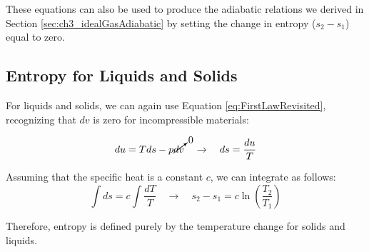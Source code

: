 These equations can also be used to produce the adiabatic relations we derived in Section \ref{sec:ch3_idealGasAdiabatic} by setting the change in entropy ($s_2 -s_1$) equal to zero.

\subsection{Entropy for Liquids and Solids}
For liquids and solids, we can again use Equation \ref{eq:FirstLawRevisited}, recognizing that $dv$ is zero for incompressible materials:

\begin{equation*}
  du = Tds - p\cancelto{0}{dv} \quad\rightarrow\quad ds = \frac{du}{T}
\end{equation*}

Assuming that the specific heat is a constant $c$, we can integrate as follows:
\begin{equation} \label{eq:entropyChangeIncompressible}
  \int ds = c\int\frac{dT}{T} \quad\rightarrow\quad s_2 - s_1 = c \ln \left(
 \frac{T_2}{T_1}\right)
\end{equation}

Therefore, entropy is defined purely by the temperature change for solids and liquids.

